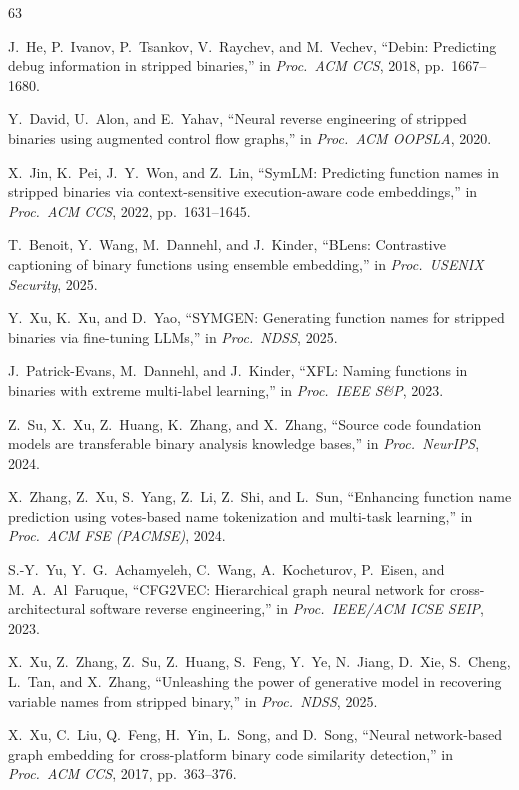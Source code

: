 \documentclass[sigconf,nonacm]{acmart}
\begin{document}

{\small
\begin{thebibliography}{63}

J.~He, P.~Ivanov, P.~Tsankov, V.~Raychev, and M.~Vechev, ``Debin: Predicting debug information in stripped binaries,'' in \emph{Proc.\ ACM CCS}, 2018, pp.~1667--1680.

Y.~David, U.~Alon, and E.~Yahav, ``Neural reverse engineering of stripped binaries using augmented control flow graphs,'' in \emph{Proc.\ ACM OOPSLA}, 2020.

X.~Jin, K.~Pei, J.~Y.~Won, and Z.~Lin, ``SymLM: Predicting function names in stripped binaries via context-sensitive execution-aware code embeddings,'' in \emph{Proc.\ ACM CCS}, 2022, pp.~1631--1645.

T.~Benoit, Y.~Wang, M.~Dannehl, and J.~Kinder, ``BLens: Contrastive captioning of binary functions using ensemble embedding,'' in \emph{Proc.\ USENIX Security}, 2025.

Y.~Xu, K.~Xu, and D.~Yao, ``SYMGEN: Generating function names for stripped binaries via fine-tuning LLMs,'' in \emph{Proc.\ NDSS}, 2025.

J.~Patrick-Evans, M.~Dannehl, and J.~Kinder, ``XFL: Naming functions in binaries with extreme multi-label learning,'' in \emph{Proc.\ IEEE S\&P}, 2023.

Z.~Su, X.~Xu, Z.~Huang, K.~Zhang, and X.~Zhang, ``Source code foundation models are transferable binary analysis knowledge bases,'' in \emph{Proc.\ NeurIPS}, 2024.

X.~Zhang, Z.~Xu, S.~Yang, Z.~Li, Z.~Shi, and L.~Sun, ``Enhancing function name prediction using votes-based name tokenization and multi-task learning,'' in \emph{Proc.\ ACM FSE (PACMSE)}, 2024.

S.-Y.~Yu, Y.~G.~Achamyeleh, C.~Wang, A.~Kocheturov, P.~Eisen, and M.~A.~Al~Faruque, ``CFG2VEC: Hierarchical graph neural network for cross-architectural software reverse engineering,'' in \emph{Proc.\ IEEE/ACM ICSE SEIP}, 2023.

X.~Xu, Z.~Zhang, Z.~Su, Z.~Huang, S.~Feng, Y.~Ye, N.~Jiang, D.~Xie, S.~Cheng, L.~Tan, and X.~Zhang, ``Unleashing the power of generative model in recovering variable names from stripped binary,'' in \emph{Proc.\ NDSS}, 2025.

X.~Xu, C.~Liu, Q.~Feng, H.~Yin, L.~Song, and D.~Song, ``Neural network-based graph embedding for cross-platform binary code similarity detection,'' in \emph{Proc.\ ACM CCS}, 2017, pp.~363--376.


\end{thebibliography}}
\end{document}
